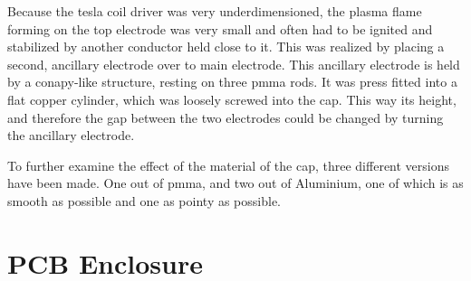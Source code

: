 Because the tesla coil driver was very underdimensioned, the plasma flame forming on the top electrode was very small and often had to be ignited and stabilized by another conductor held close to it. This was realized by placing a second, ancillary electrode over to main electrode. This ancillary electrode is held by a conapy-like structure, resting on three \gls{pmma} rods. It was press fitted into a flat copper cylinder, which was loosely screwed into the cap. This way its height, and therefore the gap between the two electrodes could be changed by turning the ancillary electrode. 

To further examine the effect of the material of the cap, three different versions have been made. One out of \gls{pmma}, and two out of Aluminium, one of which is as smooth as possible and one as pointy as possible.

\section{PCB Enclosure}

